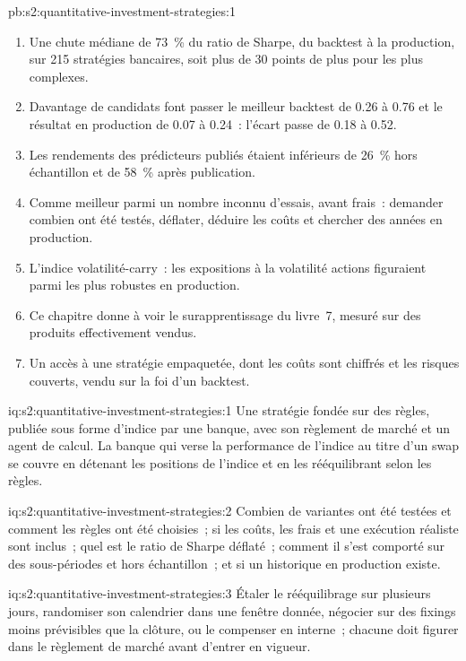 \begin{solution}{pb:s2:quantitative-investment-strategies:1}
\begin{enumerate}
\item Une chute médiane de 73~\% du ratio de Sharpe, du backtest à la production, sur 215 stratégies bancaires, soit plus de 30 points de plus pour les plus complexes.
\item Davantage de candidats font passer le meilleur backtest de 0.26 à 0.76 et le résultat en production de 0.07 à 0.24~: l'écart passe de 0.18 à 0.52.
\item Les rendements des prédicteurs publiés étaient inférieurs de 26~\% hors échantillon et de 58~\% après publication.
\item Comme meilleur parmi un nombre inconnu d'essais, avant frais~: demander combien ont été testés, déflater, déduire les coûts et chercher des années en production.
\item L'indice volatilité-carry~: les expositions à la volatilité actions figuraient parmi les plus robustes en production.
\item Ce chapitre donne à voir le surapprentissage du livre~7, mesuré sur des produits effectivement vendus.
\item Un accès à une stratégie empaquetée, dont les coûts sont chiffrés et les risques couverts, vendu sur la foi d'un backtest.
\end{enumerate}
\end{solution}

\begin{solution}{iq:s2:quantitative-investment-strategies:1}
Une stratégie fondée sur des règles, publiée sous forme d'indice par une banque, avec son règlement de marché et un agent de calcul. La banque qui verse la performance de l'indice au titre d'un swap se couvre
en détenant les positions de l'indice et en les rééquilibrant selon les règles.
\end{solution}

\begin{solution}{iq:s2:quantitative-investment-strategies:2}
Combien de variantes ont été testées et comment les règles ont été choisies~; si les coûts, les frais et une exécution réaliste sont inclus~; quel est le
ratio de Sharpe déflaté~; comment il s'est comporté sur des sous-périodes et hors échantillon~; et si un historique en production existe.
\end{solution}

\begin{solution}{iq:s2:quantitative-investment-strategies:3}
Étaler le rééquilibrage sur plusieurs jours, randomiser son calendrier dans une fenêtre donnée, négocier sur des fixings moins prévisibles que la clôture, ou le compenser
en interne~; chacune doit figurer dans le règlement de marché avant d'entrer en vigueur.
\end{solution}

